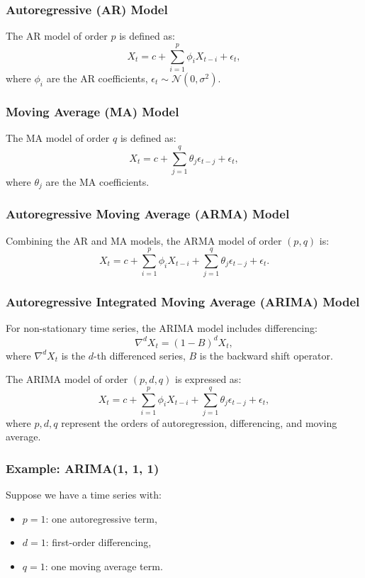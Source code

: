 \documentclass[12pt,a4paper]{article}
\begin{document}
\subsubsection{Autoregressive (AR) Model}
The AR model of order \( p \) is defined as:
\[
X_t = c + \sum_{i=1}^p \phi_i X_{t-i} + \epsilon_t,
\]
where \( \phi_i \) are the AR coefficients, \( \epsilon_t \sim \mathcal{N}(0, \sigma^2) \).

\subsubsection{Moving Average (MA) Model}
The MA model of order \( q \) is defined as:
\[
X_t = c + \sum_{j=1}^q \theta_j \epsilon_{t-j} + \epsilon_t,
\]
where \( \theta_j \) are the MA coefficients.

\subsubsection{Autoregressive Moving Average (ARMA) Model}
Combining the AR and MA models, the ARMA model of order \( (p, q) \) is:
\[
X_t = c + \sum_{i=1}^p \phi_i X_{t-i} + \sum_{j=1}^q \theta_j \epsilon_{t-j} + \epsilon_t.
\]

\subsubsection{Autoregressive Integrated Moving Average (ARIMA) Model}
For non-stationary time series, the ARIMA model includes differencing:
\[
\nabla^d X_t = (1 - B)^d X_t,
\]
where \( \nabla^d X_t \) is the \( d \)-th differenced series, \( B \) is the backward shift operator.

The ARIMA model of order \( (p, d, q) \) is expressed as:
\[
X_t = c + \sum_{i=1}^p \phi_i X_{t-i} + \sum_{j=1}^q \theta_j \epsilon_{t-j} + \epsilon_t,
\]
where \( p, d, q \) represent the orders of autoregression, differencing, and moving average.

\subsubsection{Example: ARIMA(1, 1, 1)}
Suppose we have a time series with:
\begin{itemize}
    \item \( p = 1 \): one autoregressive term,
    \item \( d = 1 \): first-order differencing,
    \item \( q = 1 \): one moving average term.
\end{itemize}
\end{document}
